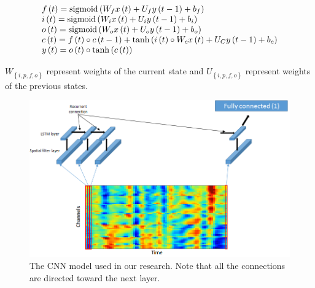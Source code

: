 \documentclass[
12pt, %
english, %
doublespacing, %
headsepline, %
]{MastersDoctoralThesis} %
\begin{document}
\[\begin{array}{l}
f\left( t \right) = {\rm{sigmoid}}\left( {{W_f}x\left( t \right) + {U_f}y\left( {t - 1} \right) + {b_f}} \right)\\
i\left( t \right) = {\rm{sigmoid}}\left( {{W_i}x\left( t \right) + {U_i}y\left( {t - 1} \right) + {b_i}} \right)\\
o\left( t \right) = {\rm{sigmoid}}\left( {{W_o}x\left( t \right) + {U_o}y\left( {t - 1} \right) + {b_o}} \right)\\
c\left( t \right) = f\left( t \right) \circ c\left( {t - 1} \right) + \tanh \left( {i\left( t \right) \circ {W_c}x\left( t \right) + {U_C}y\left( {t - 1} \right) + {b_c}} \right)\\
y\left( t \right) = o\left( t \right) \circ \tanh \left( {c\left( t \right)} \right)
\end{array}\]

${W_{\left\{ {i,p,f,o} \right\}}}$ represent weights of the current state and  ${U_{\left\{ {i,p,f,o} \right\}}}$ represent weights of the previous states. 

\begin{figure}
\centering
\includegraphics[width=1.1\linewidth]{Figures/LSTM_CNN_detailed}
\caption{The CNN model used in our research. Note that all the connections are directed toward the next layer.}
\label{fig:LSTM_CNN_detailed}
\end{figure}
\end{document}
